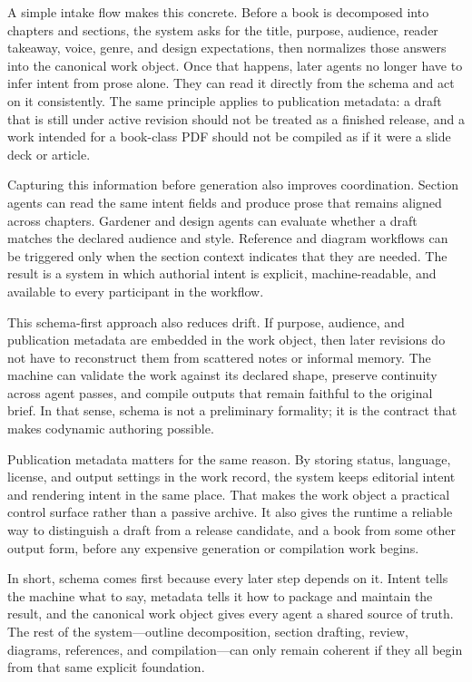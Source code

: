 \documentclass[11pt]{article}
\begin{document}
A simple intake flow makes this concrete. Before a book is decomposed into chapters and sections, the system asks for the title, purpose, audience, reader takeaway, voice, genre, and design expectations, then normalizes those answers into the canonical work object. Once that happens, later agents no longer have to infer intent from prose alone. They can read it directly from the schema and act on it consistently. The same principle applies to publication metadata: a draft that is still under active revision should not be treated as a finished release, and a work intended for a book-class PDF should not be compiled as if it were a slide deck or article.

Capturing this information before generation also improves coordination. Section agents can read the same intent fields and produce prose that remains aligned across chapters. Gardener and design agents can evaluate whether a draft matches the declared audience and style. Reference and diagram workflows can be triggered only when the section context indicates that they are needed. The result is a system in which authorial intent is explicit, machine-readable, and available to every participant in the workflow.

This schema-first approach also reduces drift. If purpose, audience, and publication metadata are embedded in the work object, then later revisions do not have to reconstruct them from scattered notes or informal memory. The machine can validate the work against its declared shape, preserve continuity across agent passes, and compile outputs that remain faithful to the original brief. In that sense, schema is not a preliminary formality; it is the contract that makes codynamic authoring possible.

Publication metadata matters for the same reason. By storing status, language, license, and output settings in the work record, the system keeps editorial intent and rendering intent in the same place. That makes the work object a practical control surface rather than a passive archive. It also gives the runtime a reliable way to distinguish a draft from a release candidate, and a book from some other output form, before any expensive generation or compilation work begins.

In short, schema comes first because every later step depends on it. Intent tells the machine what to say, metadata tells it how to package and maintain the result, and the canonical work object gives every agent a shared source of truth. The rest of the system---outline decomposition, section drafting, review, diagrams, references, and compilation---can only remain coherent if they all begin from that same explicit foundation.
\end{document}
